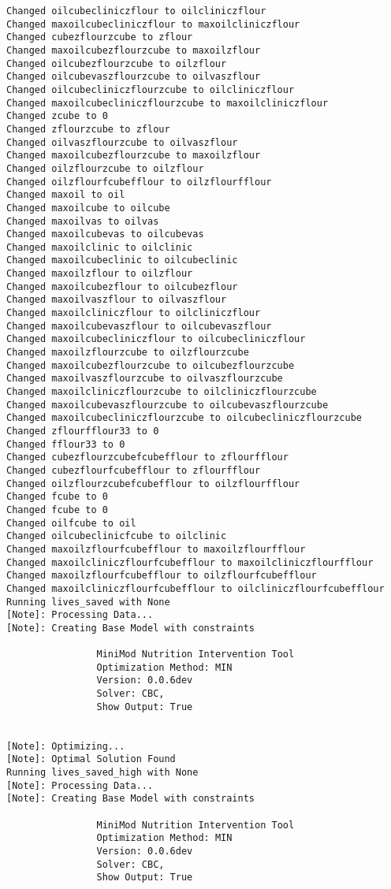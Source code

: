 \documentclass[
]{article}
\begin{document}
\begin{verbatim}
Changed oilcubecliniczflour to oilcliniczflour
Changed maxoilcubecliniczflour to maxoilcliniczflour
Changed cubezflourzcube to zflour
Changed maxoilcubezflourzcube to maxoilzflour
Changed oilcubezflourzcube to oilzflour
Changed oilcubevaszflourzcube to oilvaszflour
Changed oilcubecliniczflourzcube to oilcliniczflour
Changed maxoilcubecliniczflourzcube to maxoilcliniczflour
Changed zcube to 0
Changed zflourzcube to zflour
Changed oilvaszflourzcube to oilvaszflour
Changed maxoilcubezflourzcube to maxoilzflour
Changed oilzflourzcube to oilzflour
Changed oilzflourfcubefflour to oilzflourfflour
Changed maxoil to oil
Changed maxoilcube to oilcube
Changed maxoilvas to oilvas
Changed maxoilcubevas to oilcubevas
Changed maxoilclinic to oilclinic
Changed maxoilcubeclinic to oilcubeclinic
Changed maxoilzflour to oilzflour
Changed maxoilcubezflour to oilcubezflour
Changed maxoilvaszflour to oilvaszflour
Changed maxoilcliniczflour to oilcliniczflour
Changed maxoilcubevaszflour to oilcubevaszflour
Changed maxoilcubecliniczflour to oilcubecliniczflour
Changed maxoilzflourzcube to oilzflourzcube
Changed maxoilcubezflourzcube to oilcubezflourzcube
Changed maxoilvaszflourzcube to oilvaszflourzcube
Changed maxoilcliniczflourzcube to oilcliniczflourzcube
Changed maxoilcubevaszflourzcube to oilcubevaszflourzcube
Changed maxoilcubecliniczflourzcube to oilcubecliniczflourzcube
Changed zflourfflour33 to 0
Changed fflour33 to 0
Changed cubezflourzcubefcubefflour to zflourfflour
Changed cubezflourfcubefflour to zflourfflour
Changed oilzflourzcubefcubefflour to oilzflourfflour
Changed fcube to 0
Changed fcube to 0
Changed oilfcube to oil
Changed oilcubeclinicfcube to oilclinic
Changed maxoilzflourfcubefflour to maxoilzflourfflour
Changed maxoilcliniczflourfcubefflour to maxoilcliniczflourfflour
Changed maxoilzflourfcubefflour to oilzflourfcubefflour
Changed maxoilcliniczflourfcubefflour to oilcliniczflourfcubefflour
Running lives_saved with None
[Note]: Processing Data...
[Note]: Creating Base Model with constraints

                MiniMod Nutrition Intervention Tool
                Optimization Method: MIN
                Version: 0.0.6dev
                Solver: CBC,
                Show Output: True
                
                
[Note]: Optimizing...
[Note]: Optimal Solution Found
Running lives_saved_high with None
[Note]: Processing Data...
[Note]: Creating Base Model with constraints

                MiniMod Nutrition Intervention Tool
                Optimization Method: MIN
                Version: 0.0.6dev
                Solver: CBC,
                Show Output: True
                

\end{verbatim}
\end{document}
